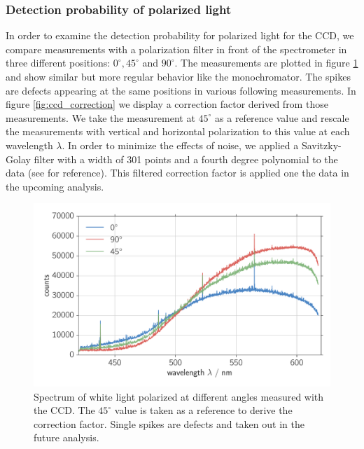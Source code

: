 \subsubsection{Detection probability of polarized light}
In order to examine the detection probability for polarized light for the CCD, we compare measurements with 
a polarization filter in front of the spectrometer in three different positions: $0^\circ, 45^\circ$ and 
$90^\circ$. The measurements are plotted in figure \ref{fig:ccd_polarized} and show similar but more regular 
behavior like the monochromator. The spikes are defects appearing at the same positions in various following 
measurements. In figure \ref{fig:ccd_correction} we display a correction factor derived from those 
measurements. We take the measurement at $45^\circ$ as a reference value and rescale the measurements with
vertical and horizontal polarization to this value at each wavelength $\lambda$. In order to minimize the 
effects of noise, we applied a Savitzky-Golay filter with a width of 301 points and a fourth degree polynomial
to the data (see \cite{numpy} for reference). This filtered correction factor is applied one the data in the 
upcoming analysis. 

\begin{figure}[htpb]
    \centering
    \includegraphics[width=0.8\linewidth]{analysis/figures/ccd_polarized}
    \caption{Spectrum of white light polarized at different angles measured with the CCD. The $45^\circ$ value
    is taken as a reference to derive the correction factor. Single spikes are defects and taken out in the 
    future analysis.}
    \label{fig:ccd_polarized}
\end{figure}

